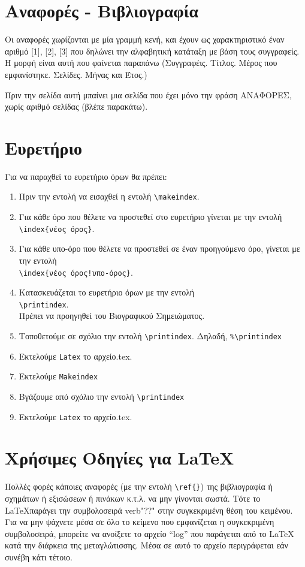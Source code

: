 \section{Αναφορές - Βιβλιογραφία}
\label{sec:2.8}

Οι αναφορές χωρίζονται με μία γραμμή κενή, και έχουν ως
χαρακτηριστικό έναν αριθμό [1], [2], [3] που δηλώνει την
αλφαβητική κατάταξη με βάση τους συγγραφείς. Η μορφή είναι αυτή
που φαίνεται παραπάνω (Συγγραφέις. Τίτλος. Μέρος που εμφανίστηκε.
Σελίδες. Μήνας και Έτος.)

Πριν την σελίδα αυτή μπαίνει μια σελίδα που έχει μόνο την φράση
ΑΝΑΦΟΡΕΣ, χωρίς αριθμό σελίδας (βλέπε παρακάτω).


\section{Ευρετήριο}
\label{sec:2.9}

Για να παραχθεί το ευρετήριο όρων θα πρέπει:

\begin{enumerate}
  \item Πριν την εντολή \s \verb""\s να εισαχθεί η
  εντολή \s\s \verb"\makeindex".
  \item Για κάθε όρο που θέλετε να προστεθεί στο ευρετήριο γίνεται
  με την εντολή \\ \s\s \verb"\index{νέος όρος}".
  \item Για κάθε υπο-όρο που θέλετε να προστεθεί σε έναν προηγούμενο όρο, γίνεται
  με την εντολή\\ \s\s \verb"\index{νέος όρος!υπο-όρος}".
  \item Κατασκευάζεται το ευρετήριο όρων με την εντολή\\ \s\s
  \verb"\printindex". \\Πρέπει να προηγηθεί του Βιογραφικού
  Σημειώματος.
  \item Τοποθετούμε σε σχόλιο την εντολή \s\s
  \verb"\printindex". Δηλαδή, \s\s
  \verb"%\printindex"
  \item Εκτελούμε \s\s
  \verb"Latex" \s\s το αρχείο.tex.
  \item Εκτελούμε \s\s
  \verb"Makeindex"
  \item Βγάζουμε από σχόλιο την εντολή \s\s
  \verb"\printindex"
  \item Εκτελούμε \s\s
  \verb"Latex" \s\s το αρχείο.tex.
\end{enumerate}






\section{Χρήσιμες Οδηγίες για \LaTeX}
\label{sec:2.10}

Πολλές φορές κάποιες αναφορές (με την εντολή \verb"\ref{}") της
βιβλιογραφία ή σχημάτων ή εξισώσεων ή πινάκων κ.τ.λ. να μην
γίνονται σωστά. Τότε το \LaTeX παράγει την συμβολοσειρά verb"??"
στην συγκεκριμένη θέση του κειμένου. Για να μην ψάχνετε μέσα σε
όλο το κείμενο που εμφανίζεται η συγκεκριμένη συμβολοσειρά,
μπορείτε να ανοίξετε το αρχείο ``log'' που παράγεται από το \LaTeX
κατά την διάρκεια της μεταγλώτισσης. Μέσα σε αυτό το αρχείο
περιγράφεται εάν συνέβη κάτι τέτοιο.
